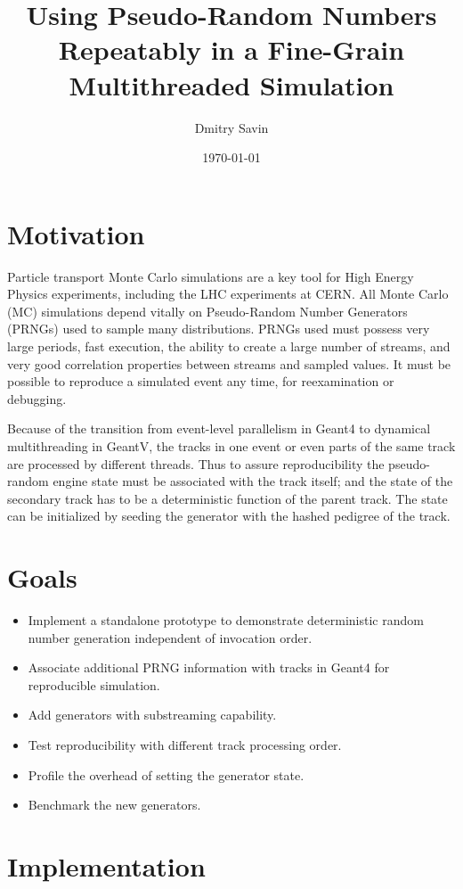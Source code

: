 \documentclass[a4paper, 12pt]{article} %
\title{Using Pseudo-Random Numbers Repeatably in a Fine-Grain Multithreaded Simulation}
\author{Dmitry Savin}
\date{\today}
\begin{document}
 \maketitle

 \section*{ Motivation }
  Particle transport Monte Carlo simulations are a key tool for High Energy Physics experiments, including the LHC experiments at CERN.
  All Monte Carlo (MC) simulations depend vitally on Pseudo-Random Number Generators (PRNGs) used to sample many distributions.
  PRNGs used must possess very large periods, fast execution, the ability to create a large number of streams, and very good correlation properties between streams and sampled values. It must be possible to reproduce a simulated event any time, for reexamination or debugging.

  Because of the transition from event-level parallelism in Geant4 to dynamical multithreading in GeantV, the tracks in one event or even parts of the same track are processed by different threads.
  Thus to assure reproducibility the pseudo-random engine state must be associated with the track itself;
  and the state of the secondary track has to be a deterministic function of the parent track.
  The state can be initialized by seeding the generator with the hashed pedigree of the track.
  
 \section*{ Goals }
 
  \begin{itemize}
   \item Implement a standalone prototype to demonstrate deterministic random number generation independent of invocation order.
   \item Associate additional PRNG information with tracks in Geant4 for reproducible simulation.
   \item Add generators with substreaming capability.
   \item Test reproducibility with different track processing order.
   \item Profile the overhead of setting the generator state.
   \item Benchmark the new generators.
  \end{itemize}
  
 \section*{ Implementation }
 
\end{document}

